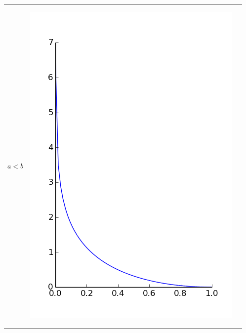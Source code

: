 \begin{tabular}{m{4cm} m{4cm} m{4cm}}
\begin{center}
$a<b$
\end{center}
&
\begin{center}
\includegraphics[scale=.3]{imagenes/perse_a_1_b_1.png}


\end{center}
\end{tabular}
